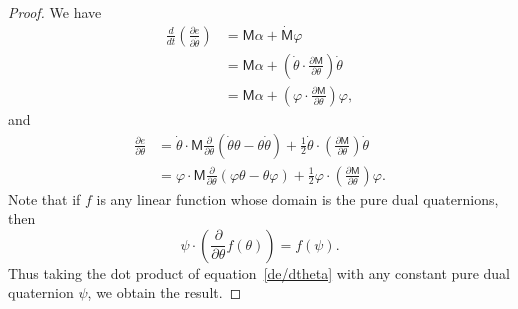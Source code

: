 \documentclass[reqno,12pt]{amsart}
\begin{document}
\begin{proof}
We have
\begin{equation}
\begin{aligned}
\frac d{dt}\left(\frac{\partial e}{\partial \dot\theta}\right)
&= \mathsf M\alpha + \dot{\mathsf M} \varphi \\
&= \mathsf M\alpha + \left(\dot\theta \cdot \frac{\partial \mathsf M}{\partial\theta}\right) \dot\theta \\
& = \mathsf M\alpha + \left(\varphi \cdot \frac{\partial \mathsf M}{\partial\theta}\right) \varphi,
\end{aligned}
\end{equation}
and
\begin{equation}
\label{de/dtheta}
\begin{aligned}
\frac{\partial e}{\partial \theta}
&= \dot \theta \cdot \mathsf M \frac{\partial}{\partial\theta}(\dot\theta \theta - \theta \dot\theta) + \tfrac12 \dot\theta \cdot \left(\frac{\partial \mathsf M}{\partial\theta}\right) \dot\theta \\
&= \varphi \cdot \mathsf M \frac{\partial}{\partial\theta}(\varphi \theta - \theta \varphi) + \tfrac12 \varphi \cdot \left(\frac{\partial \mathsf M}{\partial\theta}\right) \varphi .
\end{aligned}
\end{equation}
Note that if $f$ is any linear function whose domain is the pure dual quaternions, then
\begin{equation}
\psi \cdot \left(\frac{\partial}{\partial \theta} f(\theta)\right) = f(\psi) .
\end{equation}
Thus taking the dot product of equation~\eqref{de/dtheta} with any constant pure dual quaternion $\psi$, we obtain the result.
\end{proof}

\end{document}
